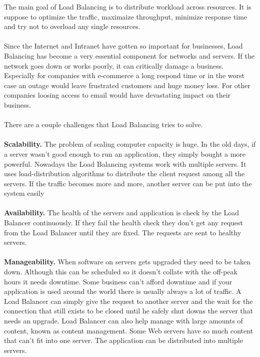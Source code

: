 \documentclass[12p]{article}
\begin{document}
	
	The main goal of Load Balancing is to distribute workload across resources. It is suppose to optimize the traffic, maximaize throughput, minimize response time and try not to overload any single resources. \\\\
	Since the Internet and Intranet have gotten so important for businesses, Load Balancing has become a very essential component for networks and servers. If the network goes down or works poorly, it can critically damage a business. Especially for companies with e-commerce a long respond time or in the worst case an outage would leave frustrated customers and huge money loss. For other companies loosing access to email would have devastating impact on their business.  \cite{lb_SFC} \\\\
	There are a couple challenges that Load Balancing tries to solve. \\\\ 
	\textbf{Scalability.} The problem of scaling computer capacity is huge. In the old days, if a server wasn't good enough to run an application, they simply bought a more powerful. Nowadays the Load Balancing systems work with multiple servers. It uses load-distribution algorithms to distribute the client request among all the servers.
	If the traffic becomes more and more, another server can be put into the system easily \cite{lb_SFC} \\\\
	\textbf{Availability.} The health of the servers and application is check by the Load Balancer continuously. If they fail the health check they don't get any request from the Load Balancer until they are fixed. The requests are sent to healthy servers.\cite{lb_SFC}\\\\ 
	\textbf{Manageability.} When software on servers gets upgraded they need to be taken down. Although this can be scheduled so it doesn't collate with the off-peak hours it needs downtime. Some business can't afford downtime and if your application is used around the world there is usually always a lot of traffic. A Load Balancer can simply give the request to another server and the wait for the connection that still exists to be closed until he safely shut downs the server that needs an upgrade. 
	Load Balancer can also help manage with large amounts of content, known as content management. Some Web servers have so much content that can't fit into one server. The application can be distributed into multiple servers.\cite{lb_SFC}
	
\end{document}
